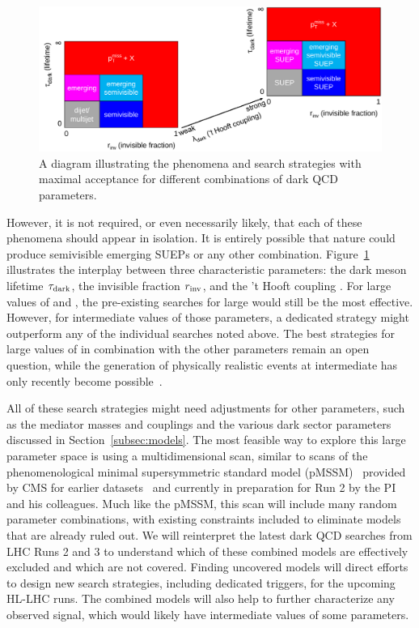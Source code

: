 \begin{figure}[htb!]
\centering
\includegraphics[width=0.95\myfigurewidth]{figures/svj_acceptance_diagram_v7.pdf}
\caption{A diagram illustrating the phenomena and search strategies with maximal acceptance for different combinations of dark QCD parameters.}
\label{fig:svjacc}
\end{figure}

However, it is not required, or even necessarily likely, that each of these phenomena should appear in isolation.
It is entirely possible that nature could produce semivisible emerging SUEPs or any other combination.
Figure~\ref{fig:svjacc} illustrates the interplay between three characteristic parameters:
the dark meson lifetime $\tau_\text{dark}$, the invisible fraction $r_{\mathrm{inv}}$, and the 't Hooft coupling \thooft.
For large values of \rinv and \taudark, the pre-existing searches for large \met would still be the most effective.
However, for intermediate values of those parameters, a dedicated strategy might outperform any of the individual searches noted above.
The best strategies for large values of \thooft in combination with the other parameters remain an open question,
while the generation of physically realistic events at intermediate \thooft has only recently become possible~\cite{Cesarotti:2020uod}.

All of these search strategies might need adjustments for other parameters,
such as the mediator masses and couplings and the various dark sector parameters discussed in Section~\ref{subsec:models}.
The most feasible way to explore this large parameter space is using a multidimensional scan,
similar to scans of the phenomenological minimal supersymmetric standard model (pMSSM)~\cite{Djouadi:1998di}
provided by CMS for earlier datasets~\cite{Khachatryan:2016nvf,SUS-16-033-supp} and currently in preparation for Run 2 by the PI and his colleagues.
Much like the pMSSM, this scan will include many random parameter combinations, with existing constraints included to eliminate models that are already ruled out.
We will reinterpret the latest dark QCD searches from LHC Runs 2 and 3 to understand which of these combined models are effectively excluded and which are not covered.
Finding uncovered models will direct efforts to design new search strategies, including dedicated triggers, for the upcoming HL-LHC runs.
The combined models will also help to further characterize any observed signal, which would likely have intermediate values of some parameters.


